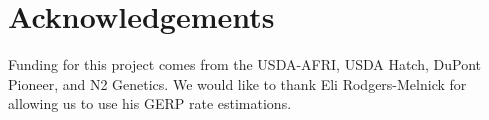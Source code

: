\documentclass[a0,portrait]{a0poster}
\begin{document}
\begin{multicols}{2}
\begin{itemize}
\end{itemize}

\color{DarkSlateGray} %






\section*{Acknowledgements}

Funding for this project comes from the USDA-AFRI, USDA Hatch, DuPont Pioneer, and N2 Genetics. We would like to thank Eli Rodgers-Melnick for allowing us to use his GERP rate estimations. 


\end{multicols}
\end{document}
